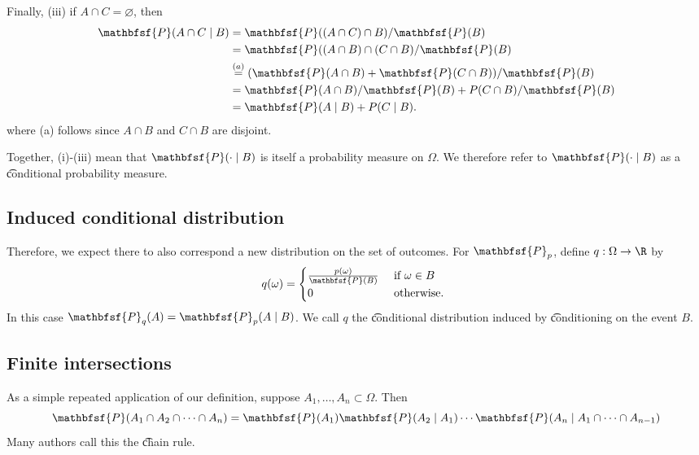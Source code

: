 Finally, (iii) if $A \cap  C = \varnothing$, then
    \[
\begin{aligned}
\mathbfsf{P} (A \cap  C \mid  B)
&=
\mathbfsf{P} ((A \cap  C) \cap  B)/\mathbfsf{P} (B) \\
&=
\mathbfsf{P} ((A \cap  B) \cap  (C \cap  B)/\mathbfsf{P} (B) \\
&\overset{(a)}{=}
(\mathbfsf{P} (A \cap  B) + \mathbfsf{P} (C \cap B))/\mathbfsf{P} (B) \\
&=
\mathbfsf{P} (A \cap  B)/\mathbfsf{P} (B) + P(C \cap B)/\mathbfsf{P} (B) \\
&=
\mathbfsf{P} (A \mid  B) + P(C \mid  B).
\end{aligned}
    \]
where (a) follows since $A \cap  B$ and $C \cap  B$ are disjoint.

Together, (i)-(iii) mean that $\mathbfsf{P} (\cdot \mid  B)$ is itself a probability measure on $\Omega $.
We therefore refer to $\mathbfsf{P} (\cdot \mid  B)$ as a \t{conditional probability measure}.

\subsection*{Induced conditional distribution}

Therefore, we expect there to also correspond a new distribution on the set of outcomes.
For $\mathbfsf{P} _p$, define $q: \Omega  \to \R $ by
    \[
q(\omega ) = \begin{cases}
\frac{p(\omega )}{\mathbfsf{P} (B)} & \text{ if } \omega  \in B \\
0 & \text{ otherwise. } \\
\end{cases}
    \]
In this case $\mathbfsf{P} _q(A) = \mathbfsf{P} _p(A \mid  B)$.
We call $q$ the \t{conditional distribution} induced by \t{conditioning on} the event $B$.

\subsection*{Finite intersections}

As a simple repeated application of our definition, suppose $A_1, \dots , A_n \subset \Omega $.
Then
    \[
\mathbfsf{P} (A_1 \cap  A_2 \cap  \cdots \cap  A_n) = \mathbfsf{P} (A_1) \mathbfsf{P} (A_2 \mid  A_1) \cdots \mathbfsf{P} (A_n \mid  A_1 \cap  \cdots \cap  A_{n-1})
    \]
Many authors call this the \t{chain rule}.
